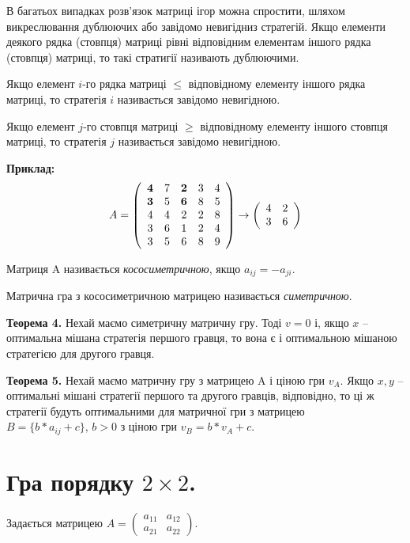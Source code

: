 \documentclass[12pt,a4paper]{report}
\begin{document}
В багатьох випадках розв'язок матриці ігор можна спростити, шляхом викреслювання дублюючих або завідомо невигідниз стратегій. Якщо елементи деякого рядка (стовпця) матриці рівні відповідним елементам іншого рядка (стовпця) матриці, то такі стратигії називають дублюючими.

Якщо елемент $i$-го рядка матриці $\le$ відповідному елементу іншого рядка матриці, то стратегія $i$ називається завідомо невигідною.

Якщо елемент $j$-го стовпця матриці $\ge$ відповідному елементу іншого стовпця матриці, то стратегія $j$ називається завідомо невигідною.

{\bf Приклад:}
\[ A = \left ( \begin{array}{ccccc}
{\bf 4} & 7 & {\bf 2} & 3 & 4 \\
{\bf 3} & 5 & {\bf 6} & 8 & 5 \\
4 & 4 &  2 & 2 & 8 \\
3 & 6 & 1 & 2 & 4 \\
3 & 5 & 6 & 8 & 9
\end{array} \right ) \to \left (  \begin{array}{cc}
4 & 2 \\
3 & 6
\end{array} \right ) \]

Матриця A називається \emph{кососиметричною}, якщо $a_{ij} = -a_{ji}$.

Матрична гра з кососиметричною матрицею називається \emph{симетричною}.

{\bf Теорема 4.}
Нехай маємо симетричну матричну гру. Тоді $v=0$ і, якщо $x$ -- оптимальна мішана стратегія першого гравця, то вона є і оптимальною мішаною стратегією для другого гравця.

{\bf Теорема 5.}
Нехай маємо матричну гру з матрицею A і ціною гри $v_A$. Якщо $x,y$ -- оптимальні мішані стратегії першого та другого гравців, відповідно, то ці ж стратегії будуть оптимальними для матричної гри з матрицею $B = \{b*a_{ij}+c\}, \, b > 0$ з ціною гри $v_B = b*v_A+c$.

\clearpage

\chapter{Гра порядку $2 \times 2$.}
Задається матрицею $A=\left ( \begin{array}{cc}a_{11}&a_{12}\\a_{21}&a_{22}\end{array}\right)$.
\end{document}
